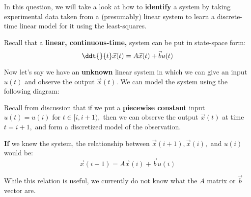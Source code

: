 

In this question, we will take a look at how to \textbf{identify} a system by taking experimental data taken from a (presumably) linear system to learn a discrete-time linear model for it using the least-squares.

Recall that a \textbf{linear, continuous-time,} system can be put in state-space form:
\begin{equation}
\ddt{}{t} \vec{x}(t) = A \vec{x}(t) + \vec{b} u(t)
\end{equation}

Now let's say we have an \textbf{unknown} linear system in which we can give an input $u(t)$ and observe the output $\vec{x}(t).$ We can model the system using the following diagram:
\begin{center}
\end{center}

Recall from discussion that if we put a \textbf{piecewise constant} input $u(t) = u(i)$ for $t \in [i, i+1),$ then we can observe the output $\vec{x}(t)$ at time $t = i + 1,$ and form a discretized model of the observation. 

\begin{center}
\end{center}

\textbf{If} we knew the system, the relationship between $\vec{x}(i+1), \vec{x}(i),$ and $u(i)$ would be:
\begin{equation}
\vec{x}(i + 1) = A \vec{x}(i) + \vec{b} u(i)
\end{equation}

While this relation is useful, we currently do not know what the $A$ matrix or $\vec{b}$ vector are.

